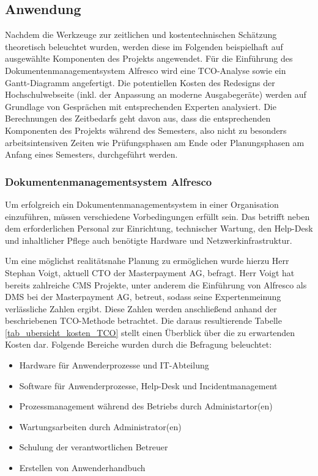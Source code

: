 \subsection{Anwendung}
Nachdem die Werkzeuge zur zeitlichen und kostentechnischen Schätzung theoretisch beleuchtet wurden, werden diese im Folgenden beispielhaft auf ausgewählte Komponenten des Projekts angewendet. Für die Einführung des Dokumentenmanagementsystem Alfresco wird eine TCO-Analyse sowie ein Gantt-Diagramm angefertigt. Die potentiellen Kosten des Redesigns der Hochschulwebseite (inkl. der Anpassung  an moderne Ausgabegeräte) werden auf Grundlage von Gesprächen mit entsprechenden Experten analysiert. Die Berechnungen des Zeitbedarfs geht davon aus, dass die entsprechenden Komponenten des Projekts während des Semesters, also nicht zu besonders arbeitsintensiven Zeiten wie Prüfungsphasen am Ende oder Planungsphasen am Anfang eines Semesters, durchgeführt werden.

\subsubsection{Dokumentenmanagementsystem Alfresco}
\label{subsubsection_dokusystem_alfresco}
Um erfolgreich ein Dokumentenmanagementsystem in einer Organisation einzuführen, müssen verschiedene Vorbedingungen erfüllt sein. Das betrifft neben dem erforderlichen Personal zur Einrichtung, technischer Wartung, den Help-Desk und inhaltlicher Pflege auch benötigte Hardware und Netzwerkinfrastruktur.

Um eine möglichst realitätsnahe Planung zu ermöglichen wurde hierzu Herr Stephan Voigt, aktuell CTO der Masterpayment AG, befragt. Herr Voigt hat bereits zahlreiche CMS Projekte, unter anderem die Einführung von Alfresco als DMS bei der Masterpayment AG, betreut, sodass seine Expertenmeinung verlässliche Zahlen ergibt. Diese Zahlen werden anschließend anhand der beschriebenen TCO-Methode betrachtet. Die daraus resultierende Tabelle \ref{tab_ubersicht_kosten_TCO} stellt einen Überblick über die zu erwartenden Kosten dar. Folgende Bereiche wurden durch die Befragung beleuchtet:

\begin{itemize}
	\item Hardware für Anwenderprozesse und IT-Abteilung
	\item Software für Anwenderprozesse, Help-Desk und Incidentmanagement
	\item Prozessmanagement während des Betriebs durch Administartor(en)
	\item Wartungsarbeiten durch Administrator(en)
	\item Schulung der verantwortlichen Betreuer
	\item Erstellen von Anwenderhandbuch
\end{itemize}

